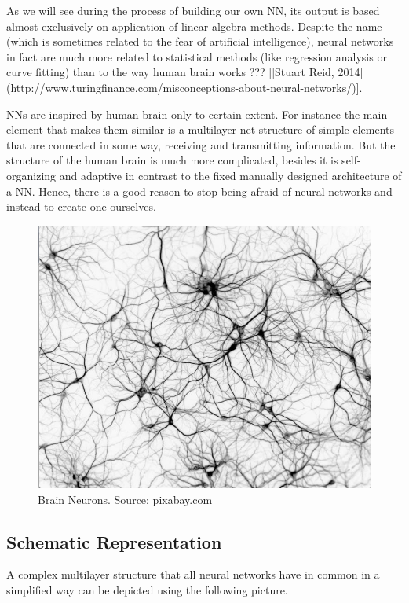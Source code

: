 As we will see during the process of building our own NN, its output is based almost exclusively on application of linear algebra methods. Despite the name (which is sometimes related to the fear of artificial intelligence), neural networks in fact are much more related to statistical methods (like regression analysis or curve fitting) than to the way human brain works ??? [[Stuart Reid, 2014](http://www.turingfinance.com/misconceptions-about-neural-networks/)]. 

NNs are inspired by human brain only to certain extent. For instance the main element that makes them similar is a multilayer net structure of simple elements that are connected in some way, receiving and transmitting information. But the structure of the human brain is much more complicated, besides it is self-organizing and adaptive in contrast to the fixed manually designed architecture of a NN. Hence, there is a good reason to stop being afraid of neural networks and instead to create one ourselves.

\begin{figure}[H]
    \includegraphics[width=\linewidth]{pics/neurons_net3.png}
    \caption{\label{fig:real-neurons} Brain Neurons. Source: pixabay.com}
\end{figure}


\subsection{Schematic Representation}
A complex multilayer structure that all neural networks have in common in a simplified way can be depicted using the following picture.

